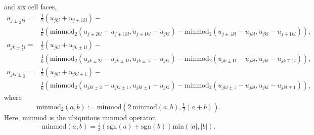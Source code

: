 \documentclass{aastex63}
\begin{document}
and six cell faces,
\begin{equation}
\begin{split}
u_{j \pm \tfrac{1}{2} k l } = & 
\frac{1}{2}\left(u_{ j k l } + u_{j \pm 1 k l}\right) - \\
& \frac{1}{6}\left(
\mathrm{minmod}_2 \left(u_{j \pm 2 k l} - u_{j \pm 1 k l }, u_{j \pm 1 k l} - u_{j k l }   \right) -
\mathrm{minmod}_2 \left(u_{j \pm 1 k l} - u_{j k l}, u_{j k l } - u_{j \mp 1 k l}   \right)
\right),
\end{split}
\end{equation}
\begin{equation}
\begin{split}
u_{j  k \pm \tfrac{1}{2} l} = & 
\frac{1}{2}\left(u_{ j k l } + u_{j k \pm 1 l}\right) - \\
& \frac{1}{6}\left(
\mathrm{minmod}_2 \left(u_{j k \pm 2 l} - u_{j k \pm 1 l }, u_{j k \pm 1 l } - u_{j k l }   \right) -
\mathrm{minmod}_2 \left(u_{j k \pm 1 l} - u_{j k l}, u_{j k l } - u_{j k \mp 1 l }   \right)
\right),
\end{split}
\end{equation}
\begin{equation}
\begin{split}
u_{j  k l \pm \tfrac{1}{2}} = & 
\frac{1}{2}\left(u_{ j k l } + u_{j k l \pm 1}\right) - \\
& \frac{1}{6}\left(
\mathrm{minmod}_2 \left(u_{j k l \pm 2} - u_{j k l \pm  1}, u_{j k l \pm 1} - u_{j k l }   \right) -
\mathrm{minmod}_2 \left(u_{j k l \pm 1} - u_{j k l}, u_{j k l } - u_{j k l \mp 1 }   \right)
\right),
\end{split}
\end{equation}
where
\begin{equation}
\mathrm{minmod}_2 \left( a, b \right) := \mathrm{minmod} \left( 2 \ \mathrm{minmod}\left(a,b\right), \tfrac{1}{2}\left(a + b\right)\right).
\end{equation}
Here, $\mathrm{minmod}$ is the ubiquitous minmod operator, 
\begin{equation}
\mathrm{minmod}\left(a,b\right) = \tfrac{1}{2}\left(\mathrm{sgn}\left(a\right)+\mathrm{sgn}\left(b\right)\right) \mathrm{min}\left( | a |, | b | \right).
\end{equation}





\end{document}
